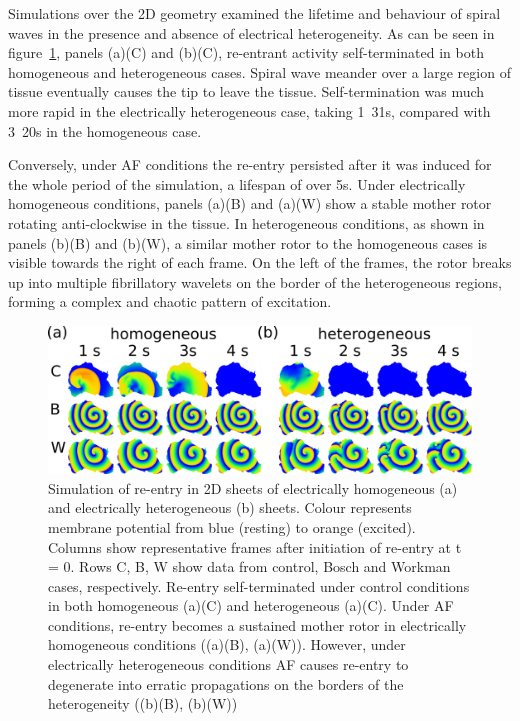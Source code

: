 Simulations over the 2D geometry examined the lifetime and behaviour of
spiral waves in the presence and absence of electrical heterogeneity.
As can be seen in figure~\ref{fig:toolkit:afer:2d}, panels (a)(C) and (b)(C), re-entrant
activity self-terminated in both homogeneous and heterogeneous cases.
Spiral wave meander over a large region of tissue eventually causes the tip to
leave the tissue.
Self-termination was much more rapid in the electrically heterogeneous case,
taking \unit{1.31}{s}, compared with \unit{3.20}{s} in the homogeneous case.

Conversely, under AF conditions the re-entry persisted after it was
induced for the whole period of the simulation, a lifespan of over \unit{5}{s}.
Under electrically homogeneous conditions, panels (a)(B) and (a)(W) show a
stable mother rotor rotating anti-clockwise in the tissue.
In heterogeneous conditions, as shown in panels (b)(B) and (b)(W), a similar
mother rotor to the homogeneous cases is visible towards the right of each
frame.
On the left of the frames, the rotor breaks up into multiple fibrillatory
wavelets on the border of the heterogeneous regions, forming a complex and
chaotic pattern of excitation.

\begin{figure}
\centering
\includegraphics{figures/toolkit/afer/2d_plots}
\caption[AFER 2D re-entry plots]{
\label{fig:toolkit:afer:2d}
Simulation of re-entry in 2D sheets of electrically homogeneous
(a) and electrically heterogeneous (b) sheets.
Colour represents membrane potential from blue (resting) to orange (excited).
Columns show representative frames after initiation of re-entry at t = 0.
Rows C, B, W show data from control, Bosch and Workman cases, respectively.
Re-entry self-terminated under control conditions in both homogeneous (a)(C) and
heterogeneous (a)(C).
Under AF conditions, re-entry becomes a sustained mother rotor in
electrically homogeneous conditions ((a)(B), (a)(W)).
However, under electrically heterogeneous conditions AF causes re-entry to degenerate
into erratic propagations on the borders of the heterogeneity ((b)(B), (b)(W)) }
\end{figure}

